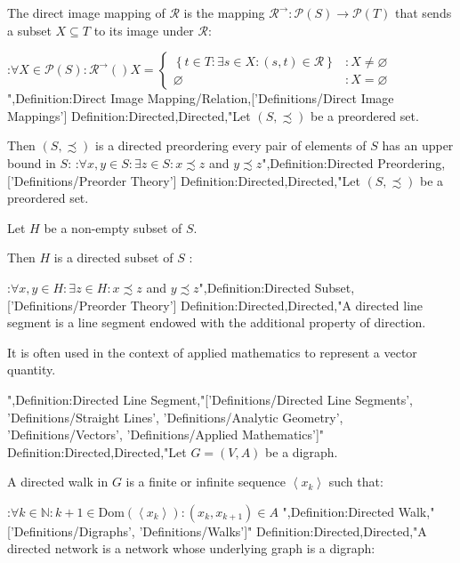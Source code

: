 The direct image mapping of $\mathcal R$ is the mapping $\mathcal R^\to: \mathcal P \left( S \right) \to \mathcal P \left( T \right)$ that sends a subset $X \subseteq T$ to its image under $\mathcal R$:

:$\forall X \in \mathcal P \left( S \right): \mathcal R^\to \left(   \right)X = \begin {cases} \left\lbrace t \in T: \exists s \in X: \left( s, t \right) \in \mathcal R \right\rbrace & : X \ne \varnothing \\ \varnothing & : X = \varnothing \end {cases}$",Definition:Direct Image Mapping/Relation,['Definitions/Direct Image Mappings']
Definition:Directed,Directed,"Let $\left( S, \precsim \right)$ be a preordered set.


Then $\left( S, \precsim \right)$ is a directed preordering  every pair of elements of $S$ has an upper bound in $S$:
:$\forall x, y \in S: \exists z \in S: x \precsim z$ and $y \precsim z$",Definition:Directed Preordering,['Definitions/Preorder Theory']
Definition:Directed,Directed,"Let $\left( S, \precsim \right)$ be a preordered set.

Let $H$ be a non-empty subset of $S$.

Then $H$ is a directed subset of $S$ :

:$\forall x, y \in H: \exists z \in H: x \precsim z$ and $y \precsim z$",Definition:Directed Subset,['Definitions/Preorder Theory']
Definition:Directed,Directed,"A directed line segment is a line segment endowed with the additional property of direction.

It is often used in the context of applied mathematics to represent a vector quantity.





",Definition:Directed Line Segment,"['Definitions/Directed Line Segments', 'Definitions/Straight Lines', 'Definitions/Analytic Geometry', 'Definitions/Vectors', 'Definitions/Applied Mathematics']"
Definition:Directed,Directed,"Let $G = \left( V, A \right)$ be a digraph.


A directed walk in $G$ is a finite or infinite sequence $\left\langle x_k \right\rangle$ such that:

:$\forall k \in \mathbb N: k + 1 \in \mathrm {Dom} \left( \left\langle x_k \right\rangle  \right): \left( x_k, x_{k + 1}  \right) \in A$
",Definition:Directed Walk,"['Definitions/Digraphs', 'Definitions/Walks']"
Definition:Directed,Directed,"A directed network is a network whose underlying graph is a digraph:



